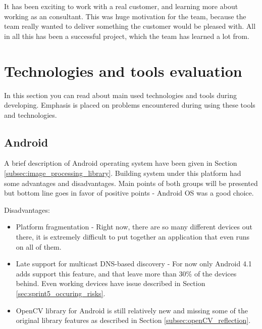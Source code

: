 It has been exciting to work with a real customer, and learning more about working as an consultant. This was huge motivation for the team, because the team really wanted to deliver something the customer would be pleased with. All in all this has been a successful project, which the team has learned a lot from.

\section{Technologies and tools evaluation}
In this section you can read about main used technologies and tools during developing.
Emphasis is placed on problems encountered during using these tools and technologies.

\subsection{Android}
A brief description of Android operating system have been given in Section \ref{subsec:image_processing_library}. Building system under this platform had some advantages and disadvantages. Main points of both groups will be presented but bottom line goes in favor of positive points - Android OS was a good choice.

Disadvantages:
\begin{itemize}
\item Platform fragmentation - Right now, there are so many different devices out there, it is extremely difficult to put together an application that even runs on all of them.
\item Late support for multicast DNS-based discovery - For now only Android 4.1 adds support this feature, and that leave more than 30\% of the devices behind. Even working devices have issue described in Section \ref{sec:sprint5_occuring_risks}.
\item OpenCV library for Android is still relatively new and missing some of the original library features as described in Section \ref{subsec:openCV_reflection}.
\end{itemize}

